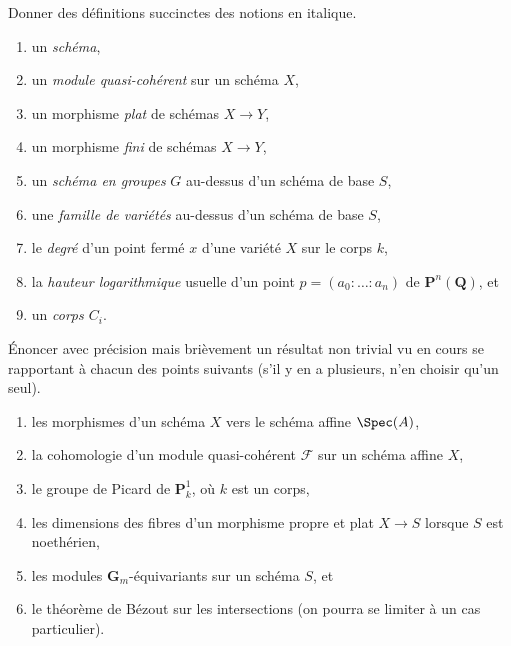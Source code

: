 \begin{exercise}[Définitions]
\label{exercise-definitions-spring-2022}
Donner des définitions succinctes des notions en italique.
\begin{enumerate}
\item un {\it schéma},
\item un {\it module quasi-cohérent} sur un schéma $X$,
\item un morphisme {\it plat} de schémas $X \to Y$,
\item un morphisme {\it fini} de schémas $X \to Y$,
\item un {\it schéma en groupes} $G$ au-dessus d'un schéma de base $S$,
\item une {\it famille de variétés} au-dessus d'un schéma de base $S$,
\item le {\it degré} d'un point fermé $x$ d'une variété $X$
sur le corps $k$,
\item la {\it hauteur logarithmique} usuelle d'un point
$p = (a_0 : \ldots : a_n)$ de $\mathbf{P}^n(\mathbf{Q})$, et
\item un {\it corps $C_i$}.
\end{enumerate}
\end{exercise}

\begin{exercise}[Théorèmes]
\label{exercise-results-spring-2022}
Énoncer avec précision mais brièvement un résultat non trivial vu en cours
se rapportant à chacun des points suivants (s'il y en a plusieurs, n'en choisir
qu'un seul).
\begin{enumerate}
\item les morphismes d'un schéma $X$ vers le schéma affine $\Spec(A)$,
\item la cohomologie d'un module quasi-cohérent $\mathcal{F}$ sur
un schéma affine $X$,
\item le groupe de Picard de $\mathbf{P}^1_k$, où $k$ est un corps,
\item les dimensions des fibres d'un morphisme propre et plat
$X \to S$ lorsque $S$ est noethérien,
\item les modules $\mathbf{G}_m$-équivariants sur un schéma $S$, et
\item le théorème de Bézout sur les intersections (on pourra se limiter à
un cas particulier).
\end{enumerate}
\end{exercise}

